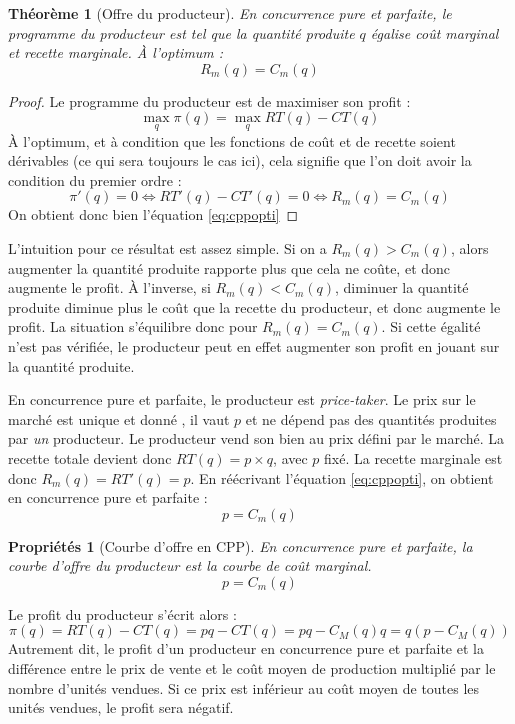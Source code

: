 \documentclass[
]{book}
\newtheorem{theorem}{Théorème}[chapter]
\newtheorem{proposition}{Propriétés}[chapter]
\theoremstyle{definition}
\theoremstyle{definition}
\theoremstyle{definition}
\theoremstyle{definition}
\theoremstyle{remark}
\begin{document}
\begin{theorem}[Offre du producteur]
En concurrence pure et parfaite, le programme du producteur est tel que la quantité produite \(q\) égalise coût marginal et recette marginale.
À l'optimum :
\begin{equation}
R_m(q) =C_m(q)
\label{eq:cppopti}
\end{equation}
\end{theorem}

\begin{proof}
Le programme du producteur est de maximiser son profit :
\[\max_q\pi(q)=\max_q RT(q)-CT(q)\]
À l'optimum, et à condition que les fonctions de coût et de recette soient dérivables (ce qui sera toujours le cas ici), cela signifie que l'on doit avoir la condition du premier ordre :
\[\pi'(q)=0\Leftrightarrow RT'(q)-CT'(q)=0\Leftrightarrow R_m(q)=C_m(q)\]
On obtient donc bien l'équation \eqref{eq:cppopti}
\end{proof}

L'intuition pour ce résultat est assez simple.
Si on a \(R_m(q)>C_m(q)\), alors augmenter la quantité produite rapporte plus que cela ne coûte, et donc augmente le profit.
À l'inverse, si \(R_m(q)<C_m(q)\), diminuer la quantité produite diminue plus le coût que la recette du producteur, et donc augmente le profit.
La situation s'équilibre donc pour \(R_m(q)=C_m(q)\).
Si cette égalité n'est pas vérifiée, le producteur peut en effet augmenter son profit en jouant sur la quantité produite.

En concurrence pure et parfaite, le producteur est \emph{price-taker}.
Le prix sur le marché est unique et donné , il vaut \(p\) et ne dépend pas des quantités produites par \emph{un} producteur.
Le producteur vend son bien au prix défini par le marché.
La recette totale devient donc \(RT(q)=p\times q\), avec \(p\) fixé.
La recette marginale est donc \(R_m(q)=RT'(q)=p\).
En réécrivant l'équation \eqref{eq:cppopti}, on obtient en concurrence pure et parfaite :
\[p=C_m(q)\]

\begin{proposition}[Courbe d'offre en CPP]
En concurrence pure et parfaite, la courbe d'offre du producteur est la courbe de coût marginal.
\[p=C_m(q)\]
\end{proposition}

Le profit du producteur s'écrit alors :
\[\pi(q)=RT(q)-CT(q)=pq-CT(q)=pq-C_M(q)q=q(p-C_M(q))\]
Autrement dit, le profit d'un producteur en concurrence pure et parfaite et la différence entre le prix de vente et le coût moyen de production multiplié par le nombre d'unités vendues.
Si ce prix est inférieur au coût moyen de toutes les unités vendues, le profit sera négatif.
\end{document}
